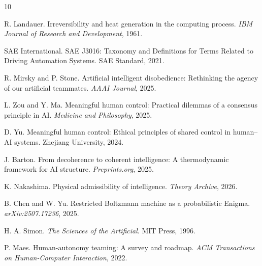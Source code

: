 \documentclass[11pt]{article}
\begin{document}
\begin{thebibliography}{10}

R. Landauer.
Irreversibility and heat generation in the computing process.
\textit{IBM Journal of Research and Development}, 1961.

SAE International.
SAE J3016: Taxonomy and Definitions for Terms Related to Driving Automation Systems.
SAE Standard, 2021.

R. Mirsky and P. Stone.
Artificial intelligent disobedience: Rethinking the agency of our artificial teammates.
\textit{AAAI Journal}, 2025.

L. Zou and Y. Ma.
Meaningful human control: Practical dilemmas of a consensus principle in AI.
\textit{Medicine and Philosophy}, 2025.

D. Yu.
Meaningful human control: Ethical principles of shared control in human--AI systems.
Zhejiang University, 2024.

J. Barton.
From decoherence to coherent intelligence: A thermodynamic framework for AI structure.
\textit{Preprints.org}, 2025.

K. Nakashima.
Physical admissibility of intelligence.
\textit{Theory Archive}, 2026.

B. Chen and W. Yu.
Restricted Boltzmann machine as a probabilistic Enigma.
\textit{arXiv:2507.17236}, 2025.

H. A. Simon.
\textit{The Sciences of the Artificial}.
MIT Press, 1996.

P. Maes.
Human-autonomy teaming: A survey and roadmap.
\textit{ACM Transactions on Human-Computer Interaction}, 2022.

\end{thebibliography}
\end{document}
